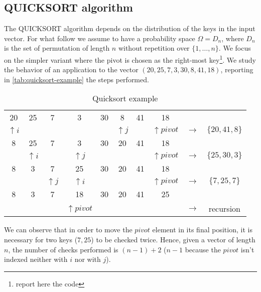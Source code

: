 \subsection{QUICKSORT algorithm}
The QUICKSORT algorithm depends on the distribution of the keys in the
input vector. For what follow we assume to have a probability space
$\Omega = D_n$, where $D_n$ is the set of permutation of length $n$
without repetition over $\{1,\ldots,n\}$. We focus on the simpler
variant where the pivot is chosen as the right-most
key\footnote{report here the code}.  We study the behavior of an
application to the vector $\left ( 20, 25, 7, 3, 30, 8, 41,
  18\right)$, reporting in \autoref{tab:quicksort-example} the steps
performed.
\begin{table}[ht]
  \caption{Quicksort example}
  \label{tab:quicksort-example}
  \begin{center}
    \begin{tabular}{cccccccccc}
      20 & 25 & 7 & 3 & 30 & 8 & 41 & 18 &  &  \\ 
      $\uparrow i$ & & & & & $\uparrow j$ & & $\uparrow pivot$ &
      $\rightarrow$ & $\{20, 41, 8\}$ \\
      8 & 25 & 7 & 3 & 30 & 20 & 41 & 18 &  &  \\ 
       & $\uparrow i$ & & $\uparrow j$ & &  & & $\uparrow pivot$ &
       $\rightarrow$ & $\{25, 30, 3\}$ \\
       8 & 3 & 7 & 25 & 30 & 20 & 41 & 18 &  &  \\ 
       &  & $\uparrow j$ & $\uparrow i$ & &  & & $\uparrow pivot$ &
       $\rightarrow$ & $\{7, 25, 7\}$ \\
       8 & 3 & 7 & 18 & 30 & 20 & 41 & 25 &  &  \\ 
       &  &  & $\uparrow pivot$ & &  & &  &
       $\rightarrow$ & recursion \\
    \end{tabular}
  \end{center}
\end{table}
We can observe that in order to move the $pivot$ element in its final
position, it is necessary for two keys ($7, 25$) to be checked
twice. Hence, given a vector of length $n$, the number of checks
performed is $(n-1) + 2$ ($n-1$ because the $pivot$ isn't indexed
neither with $i$ nor with $j$).

